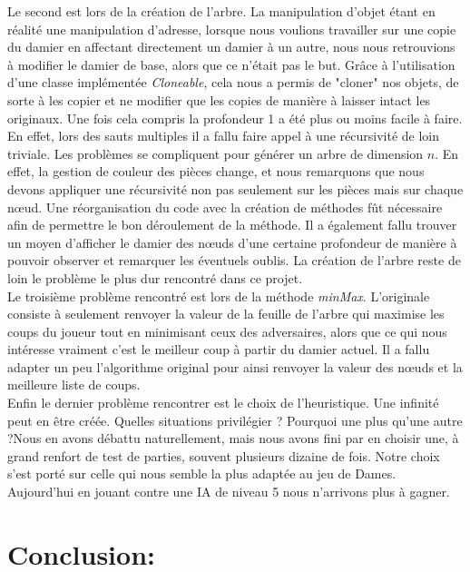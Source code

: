 \documentclass[12,french]{report}
\begin{document}
Le second est lors de la création de l'arbre. La manipulation d'objet étant en réalité une manipulation d'adresse, lorsque nous voulions travailler sur une copie du damier en affectant directement un damier à un autre, nous nous retrouvions à modifier le damier de base, alors que ce n'était pas le but. Grâce à l'utilisation d'une classe implémentée \textit{Cloneable}, cela nous a permis de "cloner" nos objets, de sorte à les copier et ne modifier que les copies de manière à laisser intact les originaux. Une fois cela compris la profondeur 1 a été plus ou moins facile à faire. En effet, lors des sauts multiples il a fallu faire appel à une récursivité de loin triviale. Les problèmes se compliquent pour générer un arbre de dimension $n$. En effet, la gestion de couleur des pièces change, et nous remarquons que nous devons appliquer une récursivité non pas seulement sur les pièces mais sur chaque nœud. Une réorganisation du code avec la création de méthodes fût nécessaire afin de permettre le bon déroulement de la méthode. Il a également fallu trouver un moyen d'afficher le damier des nœuds d'une certaine profondeur de manière à pouvoir observer et remarquer les éventuels oublis. La création de l'arbre reste de loin le problème le plus dur rencontré dans ce projet.\\

Le troisième problème rencontré est lors de la méthode \textit{minMax}. L'originale consiste à seulement renvoyer la valeur de la feuille de l'arbre qui maximise les coups du joueur tout en minimisant ceux des adversaires, alors que ce qui nous intéresse vraiment c'est le meilleur coup à partir du damier actuel. Il a fallu adapter un peu l'algorithme original pour ainsi renvoyer la valeur des nœuds et la meilleure liste de coups.\\

Enfin le dernier problème rencontrer est le choix de l'heuristique. Une infinité peut en être créée. Quelles situations privilégier ? Pourquoi une plus qu'une autre ?Nous en avons débattu naturellement, mais nous avons fini par en choisir une, à grand renfort de test de parties, souvent plusieurs dizaine de fois. Notre choix s'est porté sur celle qui nous semble la plus adaptée au jeu de Dames. Aujourd'hui en jouant contre une IA de niveau 5 nous n'arrivons plus à gagner.



\chapter*{Conclusion:}
\end{document}
